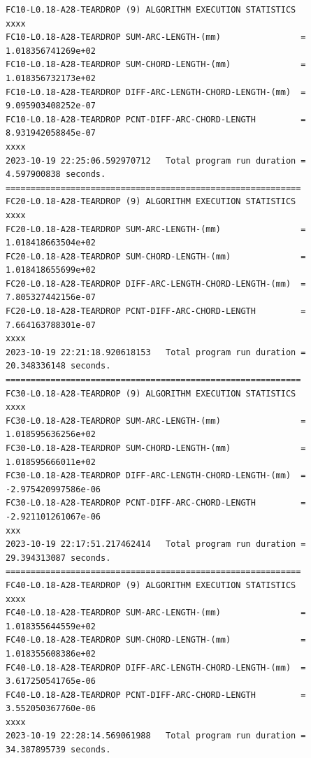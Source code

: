 \clearpage
\pagebreak
\begin{landscape}

\begin{lstlisting}[caption={Anomaly Run FC30 Teardrop L=0.18 at FC30}, label=lst-Anomaly Run FC30 Teardrop L0.18]	
FC10-L0.18-A28-TEARDROP (9) ALGORITHM EXECUTION STATISTICS 
xxxx
FC10-L0.18-A28-TEARDROP SUM-ARC-LENGTH-(mm)                =  1.018356741269e+02 
FC10-L0.18-A28-TEARDROP SUM-CHORD-LENGTH-(mm)              =  1.018356732173e+02 
FC10-L0.18-A28-TEARDROP DIFF-ARC-LENGTH-CHORD-LENGTH-(mm)  =  9.095903408252e-07 
FC10-L0.18-A28-TEARDROP PCNT-DIFF-ARC-CHORD-LENGTH         =  8.931942058845e-07 
xxxx
2023-10-19 22:25:06.592970712 	Total program run duration = 4.597900838 seconds. 
===========================================================
FC20-L0.18-A28-TEARDROP (9) ALGORITHM EXECUTION STATISTICS 
xxxx
FC20-L0.18-A28-TEARDROP SUM-ARC-LENGTH-(mm)                =  1.018418663504e+02 
FC20-L0.18-A28-TEARDROP SUM-CHORD-LENGTH-(mm)              =  1.018418655699e+02 
FC20-L0.18-A28-TEARDROP DIFF-ARC-LENGTH-CHORD-LENGTH-(mm)  =  7.805327442156e-07 
FC20-L0.18-A28-TEARDROP PCNT-DIFF-ARC-CHORD-LENGTH         =  7.664163788301e-07 
xxxx
2023-10-19 22:21:18.920618153 	Total program run duration = 20.348336148 seconds. 
===========================================================
FC30-L0.18-A28-TEARDROP (9) ALGORITHM EXECUTION STATISTICS 
xxxx
FC30-L0.18-A28-TEARDROP SUM-ARC-LENGTH-(mm)                =  1.018595636256e+02 
FC30-L0.18-A28-TEARDROP SUM-CHORD-LENGTH-(mm)              =  1.018595666011e+02 
FC30-L0.18-A28-TEARDROP DIFF-ARC-LENGTH-CHORD-LENGTH-(mm)  =  -2.975420997586e-06 
FC30-L0.18-A28-TEARDROP PCNT-DIFF-ARC-CHORD-LENGTH         =  -2.921101261067e-06 
xxx
2023-10-19 22:17:51.217462414 	Total program run duration = 29.394313087 seconds. 
===========================================================
FC40-L0.18-A28-TEARDROP (9) ALGORITHM EXECUTION STATISTICS 
xxxx
FC40-L0.18-A28-TEARDROP SUM-ARC-LENGTH-(mm)                =  1.018355644559e+02 
FC40-L0.18-A28-TEARDROP SUM-CHORD-LENGTH-(mm)              =  1.018355608386e+02 
FC40-L0.18-A28-TEARDROP DIFF-ARC-LENGTH-CHORD-LENGTH-(mm)  =  3.617250541765e-06 
FC40-L0.18-A28-TEARDROP PCNT-DIFF-ARC-CHORD-LENGTH         =  3.552050367760e-06 
xxxx
2023-10-19 22:28:14.569061988 	Total program run duration = 34.387895739 seconds.
\end{lstlisting}
\end{landscape}


